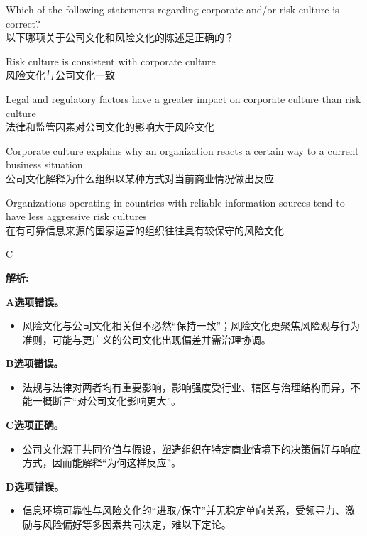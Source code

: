 \documentclass{article}
\newcounter{question} %
\newenvironment{explanation}
{\textbf{解析:}\par}
{\par}
\begin{document}
\begin{question}
    Which of the following statements regarding corporate and/or risk culture is correct?
    \\以下哪项关于公司文化和风险文化的陈述是正确的？
\end{question}

\begin{choices}
    \item Risk culture is consistent with corporate culture
    \\风险文化与公司文化一致
    \item Legal and regulatory factors have a greater impact on corporate culture than risk culture
    \\法律和监管因素对公司文化的影响大于风险文化
    \item Corporate culture explains why an organization reacts a certain way to a current business situation
    \\公司文化解释为什么组织以某种方式对当前商业情况做出反应
    \item Organizations operating in countries with reliable information sources tend to have less aggressive risk cultures
    \\在有可靠信息来源的国家运营的组织往往具有较保守的风险文化
\end{choices}

\begin{correctanswer}
    C
\end{correctanswer}

\begin{explanation}
    \textbf{A选项错误。}
    \begin{itemize}
        \item 风险文化与公司文化相关但不必然“保持一致”；风险文化更聚焦风险观与行为准则，可能与更广义的公司文化出现偏差并需治理协调。
    \end{itemize}

    \textbf{B选项错误。}
    \begin{itemize}
        \item 法规与法律对两者均有重要影响，影响强度受行业、辖区与治理结构而异，不能一概断言“对公司文化影响更大”。
    \end{itemize}

    \textbf{C选项正确。}
    \begin{itemize}
        \item 公司文化源于共同价值与假设，塑造组织在特定商业情境下的决策偏好与响应方式，因而能解释“为何这样反应”。
    \end{itemize}

    \textbf{D选项错误。}
    \begin{itemize}
        \item 信息环境可靠性与风险文化的“进取/保守”并无稳定单向关系，受领导力、激励与风险偏好等多因素共同决定，难以下定论。
    \end{itemize}
\end{explanation}
\end{document}
